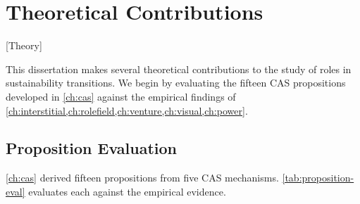 \documentclass[../main.tex]{subfiles}
\begin{document}
\section{Theoretical Contributions}[Theory]

This dissertation makes several theoretical contributions to the study of roles in sustainability transitions. We begin by evaluating the fifteen CAS propositions developed in \cref{ch:cas} against the empirical findings of \cref{ch:interstitial,ch:rolefield,ch:venture,ch:visual,ch:power}.

\subsection{Proposition Evaluation}

\cref{ch:cas} derived fifteen propositions from five CAS mechanisms. \cref{tab:proposition-eval} evaluates each against the empirical evidence.
\end{document}
